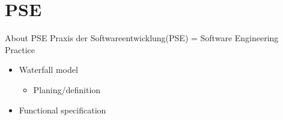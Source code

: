 \section{PSE}

\begin{frame}{About PSE}
	Praxis der Softwareentwicklung(PSE) = Software Engineering Practice
	\begin{itemize}
		\item Waterfall model
		 \begin{itemize} 
			\item Planing/definition
		\end{itemize}
		\item Functional specification
	\end{itemize}
\end{frame}